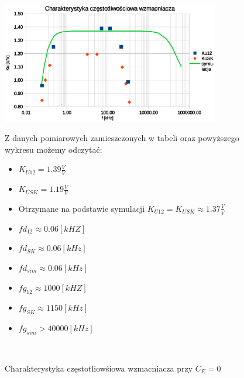 \documentclass[a4paper,12pt]{article}
\begin{document}
\begin{figure}[h!]
  \begin{center}
  \includegraphics[width=0.85\textwidth]{g2.eps}
  \caption{Charakterystyka częstotliowśiowa wzmacniacza przy $C_E = 0$}
  \end{center}
  
    Z danych pomiarowych zamieszczonych w tabeli oraz powyższego wykresu możemy odczytać:
  \begin{itemize}
  \item $K_{U12} = 1.39 \frac{V}{V}$
  \item $K_{USK} = 1.19 \frac{V}{V}$
  \item Otrzymane na podstawie symulacji $K_{U12}=K_{USK}\approx 1.37\frac{V}{V}$
  \item $fd_{12} \approx 0.06[kHZ]$
  \item $fd_{SK} \approx 0.06[kHz]$
  \item $fd_{sim} \approx 0.06[kHz]$
  \item $fg_{12} \approx 1000[kHZ]$
  \item $fg_{SK} \approx 1150[kHz]$
  \item $fg_{sim} > 40000[kHz]$
  
  \end{itemize}
      $ $ \newline
$ $ \newline
$ $ \newline
$ $ \newline
$ $ \newline
\end{figure}





\end{document}
